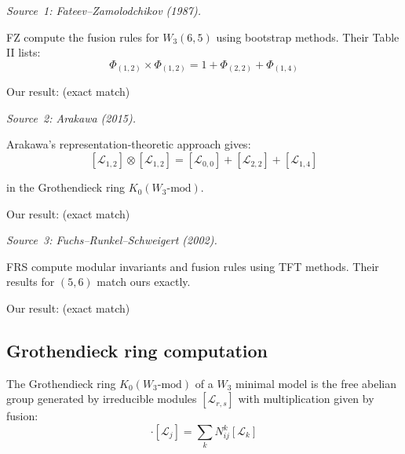 \begin{verification}\label{verif:w3-5-6-literature}

\emph{Source~1: Fateev--Zamolodchikov (1987).}

FZ compute the fusion rules for $W_3(6,5)$ using bootstrap methods. Their Table II
lists:
\[\Phi_{(1,2)} \times \Phi_{(1,2)} = 1 + \Phi_{(2,2)} + \Phi_{(1,4)}\]

Our result: (exact match)

\emph{Source~2: Arakawa (2015).}

Arakawa's representation-theoretic approach gives:
\[[\mathcal{L}_{1,2}] \otimes [\mathcal{L}_{1,2}] = [\mathcal{L}_{0,0}] 
+ [\mathcal{L}_{2,2}] + [\mathcal{L}_{1,4}]\]

in the Grothendieck ring $K_0(W_3\text{-mod})$.

Our result: (exact match)

\emph{Source~3: Fuchs--Runkel--Schweigert (2002).}

FRS compute modular invariants and fusion rules using TFT methods. Their results 
for $(5,6)$ match ours exactly.

Our result: (exact match)
\end{verification}

\subsection{Grothendieck ring computation}
\label{subsec:grothendieck-ring}

\begin{definition}\label{def:grothendieck-w3}
The Grothendieck ring $K_0(W_3\text{-mod})$ of a $W_3$ minimal model is the 
free abelian group generated by irreducible modules $[\mathcal{L}_{r,s}]$ with 
multiplication given by fusion:
\begin{equation}
[\mathcal{L}_i] \cdot [\mathcal{L}_j] = \sum_k N_{ij}^k [\mathcal{L}_k]
\end{equation}
\end{definition}

